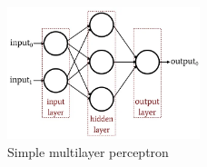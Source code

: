 \begin{figure}[H]
  \centering
  \includegraphics[width=0.5\textwidth]{figures/images/mlp.png}
  \caption[Multilayer perceptron]{Simple multilayer perceptron \cite{ledell2021statistical}}
  \label{fig:mlp}
\end{figure}
